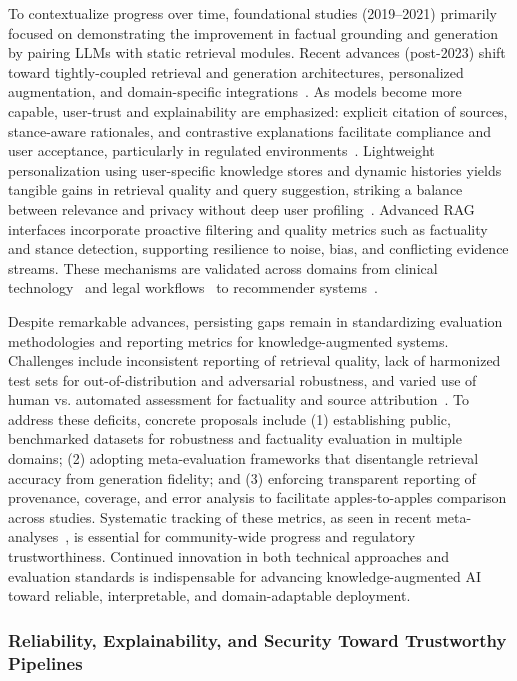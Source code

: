 \documentclass[sigconf]{acmart}
\begin{document}
To contextualize progress over time, foundational studies (2019–2021) primarily focused on demonstrating the improvement in factual grounding and generation by pairing LLMs with static retrieval modules. Recent advances (post-2023) shift toward tightly-coupled retrieval and generation architectures, personalized augmentation, and domain-specific integrations~\cite{ref14,ref16,ref36,ref54,ref55}. As models become more capable, user-trust and explainability are emphasized: explicit citation of sources, stance-aware rationales, and contrastive explanations facilitate compliance and user acceptance, particularly in regulated environments~\cite{ref17,ref43,ref46,ref48,ref54,ref62}. Lightweight personalization using user-specific knowledge stores and dynamic histories yields tangible gains in retrieval quality and query suggestion, striking a balance between relevance and privacy without deep user profiling~\cite{ref23,ref36,ref45,ref48}. Advanced RAG interfaces incorporate proactive filtering and quality metrics such as factuality and stance detection, supporting resilience to noise, bias, and conflicting evidence streams. These mechanisms are validated across domains from clinical technology~\cite{ref52,ref54,ref55} and legal workflows~\cite{ref63} to recommender systems~\cite{ref32}.

Despite remarkable advances, persisting gaps remain in standardizing evaluation methodologies and reporting metrics for knowledge-augmented systems. Challenges include inconsistent reporting of retrieval quality, lack of harmonized test sets for out-of-distribution and adversarial robustness, and varied use of human vs. automated assessment for factuality and source attribution~\cite{ref26,ref52,ref63}. To address these deficits, concrete proposals include (1) establishing public, benchmarked datasets for robustness and factuality evaluation in multiple domains; (2) adopting meta-evaluation frameworks that disentangle retrieval accuracy from generation fidelity; and (3) enforcing transparent reporting of provenance, coverage, and error analysis to facilitate apples-to-apples comparison across studies. Systematic tracking of these metrics, as seen in recent meta-analyses~\cite{ref8,ref52}, is essential for community-wide progress and regulatory trustworthiness. Continued innovation in both technical approaches and evaluation standards is indispensable for advancing knowledge-augmented AI toward reliable, interpretable, and domain-adaptable deployment.

\subsubsection{Reliability, Explainability, and Security Toward Trustworthy Pipelines}
\end{document}
